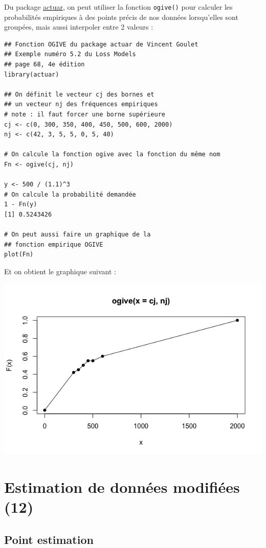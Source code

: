 \documentclass[12pt, french]{report}
\begin{document}
\begin{exemple}
Du package \href{https://cran.r-project.org/web/packages/actuar/actuar.pdf}{actuar}, on peut utiliser la fonction \texttt{ogive()} pour calculer les probabilités empiriques à des points précis de nos données lorsqu'elles sont groupées, mais aussi interpoler entre 2 valeurs : 
\begin{verbatim}
## Fonction OGIVE du package actuar de Vincent Goulet
## Exemple numéro 5.2 du Loss Models
## page 68, 4e édition
library(actuar)

## On définit le vecteur cj des bornes et
## un vecteur nj des fréquences empiriques
# note : il faut forcer une borne supérieure
cj <- c(0, 300, 350, 400, 450, 500, 600, 2000)
nj <- c(42, 3, 5, 5, 0, 5, 40)

# On calcule la fonction ogive avec la fonction du même nom
Fn <- ogive(cj, nj)

y <- 500 / (1.1)^3
# On calcule la probabilité demandée
1 - Fn(y)
[1] 0.5243426

# On peut aussi faire un graphique de la
## fonction empirique OGIVE
plot(Fn)
\end{verbatim}
Et on obtient le graphique suivant : 
\begin{center}
\includegraphics[scale=0.5]{Figures/R-ogive-plot.png}
\end{center}
\end{exemple}


\chapter{Estimation de données modifiées (12)}
\section{Point estimation}
\end{document}
